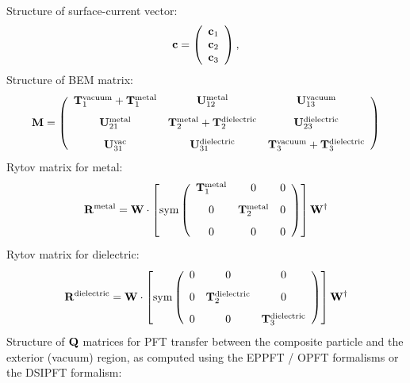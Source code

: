 \documentclass[letterpaper]{article}
\begin{document}
\noindent Structure of surface-current vector:
$$ \mathbf{c}=
   \left(\begin{array}{c} \mathbf{c}_1 \\ \mathbf{c}_2 \\ \mathbf{c}_3 \end{array}\right),
$$
Structure of BEM matrix:
$$ \mathbf{M}
    =
   \left(\begin{array}{ccc}
     \mathbf{T}_{1}^{\text{\scriptsize vacuum}} + \mathbf{T}_{1}^{\text{\scriptsize metal}}
   & \mathbf{U}_{12}^{\text{\scriptsize metal}}
   & \mathbf{U}_{13}^{\text{\scriptsize vacuum}}
\\[8pt]
     \mathbf{U}_{21}^{\text{\scriptsize metal}}
   & \mathbf{T}_{2}^{\text{\scriptsize metal}} + \mathbf{T}_{2}^{\text{\scriptsize dielectric}}
   & \mathbf{U}_{23}^{\text{\scriptsize dielectric}}
\\[8pt]
     \mathbf{U}_{31}^{\text{\scriptsize vac}}
   & \mathbf{U}_{31}^{\text{\scriptsize dielectric}}
   & \mathbf{T}_{3}^{\text{\scriptsize vacuum}} + \mathbf{T}_{3}^{\text{\scriptsize dielectric}}
   \end{array}\right)
$$
Rytov matrix for metal: 
$$ \mathbf{R}^{\text{\scriptsize metal}}
    = \mathbf{W}\cdot
   \left[
   \text{sym}
   \left(\begin{array}{ccc}
     \mathbf{T}_{1}^{\text{\scriptsize metal}}
   & 0
   & 0
\\[8pt]
     0
   & \mathbf{T}_{2}^{\text{\scriptsize metal}} 
   & 0
\\[8pt]
     0 
   & 0
   & 0
   \end{array}\right)
   \right]
   \mathbf{W}^\dagger
$$
Rytov matrix for dielectric: 
$$ \mathbf{R}^{\text{\scriptsize dielectric}}
    = \mathbf{W}\cdot
   \left[
   \text{sym}
   \left(\begin{array}{ccc}
     0
   & 0
   & 0
\\[8pt]
     0
   & \mathbf{T}_{2}^{\text{\scriptsize dielectric}} 
   & 0
\\[8pt]
     0 
   & 0
   & \mathbf{T}_{3}^{\text{\scriptsize dielectric}} 
   \end{array}\right)
   \right]
   \mathbf{W}^\dagger
$$
Structure of $\mathbf{Q}$ matrices for PFT transfer between the 
composite particle and the exterior (vacuum) region, as
computed using the EPPFT / OPFT formalisms or the DSIPFT 
formalism:
\end{document}
